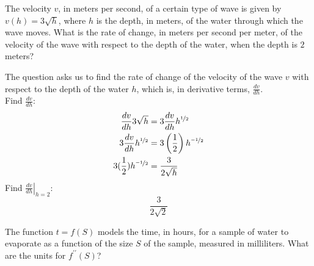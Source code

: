\documentclass[12pt,letterpaper, onecolumn]{exam}
\newcommand\at[2]{\left.#1\right|_{#2}}
\begin{document}
\begin{questions}
\pagebreak

\question The velocity $v$, in meters per second, of a certain type of wave is given by $v(h) = 3\sqrt{h}$, where $h$ is the depth, in meters, of the water through which the wave moves. What is the rate of change, in meters per second per meter, of the velocity of the wave with respect to the depth of the water, when the depth is $2$ meters?


	\begin{solution}
		The  question asks us to find the rate of change of the velocity of the wave $v$ with respect to the depth of the water $h$, which is, in derivative terms, $\frac{dv}{dh}$. \\
		Find $\frac{dv}{dh}$:
		\begin{align*}
			\frac{dv}{dh} 3\sqrt{h} & = 3 \frac{dv}{dh} h^{\nicefrac{1}{2}} \\
			3 \frac{dv}{dh} h^{\nicefrac{1}{2}} & = 3 \left(\frac{1}{2}\right) h^{\nicefrac{-1}{2}} \\
			3 (\frac{1}{2}) h^{\nicefrac{-1}{2}} & = \frac{3}{2\sqrt{h}}
		\end{align*}
		Find $\at{\frac{dv}{dh}}{h=2}$:
			$$\boxed{\frac{3}{2\sqrt{2}}}$$
	\end{solution}

\pagebreak

\question The function $t=f(S)$ models the time, in hours, for a sample of water to evaporate as a function of the size $S$ of the sample, measured in milliliters. What are the units for $f^{\prime\prime}(S)$?
	\begin{parts}

\end{parts}
\end{questions}
\end{document}
